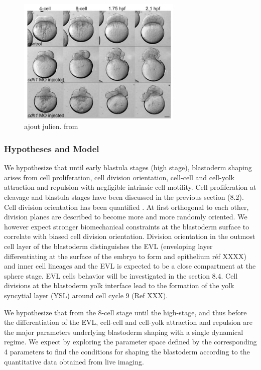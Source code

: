 \begin{figure}
\begin{center}
\includegraphics[width=0.7\textwidth]{../../images/Cases_Studies/Case_2_Cleavage/babb_2004.png}
\end{center}
\caption{ajout julien. from \cite{Babb:2004kx}}
\label{Case_2_Cleavage_babb_2004}
\end{figure}

\subsubsection{Hypotheses and Model  }

  We hypothesize that until early blastula stages (high stage), blastoderm shaping arises from cell proliferation, cell division orientation, cell-cell and cell-yolk attraction and repulsion with negligible intrinsic cell motility. Cell proliferation at cleavage and blastula stages have been discussed in the previous section (8.2). Cell division orientation has been quantified \cite{Olivier:2010jz}. At first orthogonal to each other, division planes are described to become more and more randomly oriented. We however expect stronger biomechanical constraints at the blastoderm surface to correlate with biased cell division orientation. Division orientation in the outmost cell layer of the blastoderm distinguishes the EVL (enveloping layer differentiating at the surface of the embryo to form and epithelium réf XXXX) and inner cell lineages and the EVL is expected to be a close compartment at the sphere stage. EVL cells behavior will be investigated in the section 8.4. Cell divisions at the blastoderm yolk interface lead to the formation of the yolk syncytial layer (YSL) around cell cycle 9 (Ref XXX).  

  We hypothesize that from the 8-cell stage until the high-stage, and thus before the differentiation of the EVL, cell-cell and cell-yolk attraction and repulsion are the major parameters underlying blastoderm shaping with a single dynamical regime. We expect by exploring the parameter space defined by the corresponding 4 parameters to find the conditions for shaping the blastoderm according to the quantitative data obtained from live imaging. 

